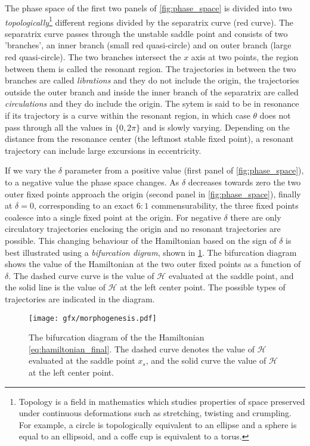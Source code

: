 \documentclass[ twoside,openright,titlepage,numbers=noenddot,headinclude,%
                footinclude=true,cleardoublepage=empty,abstractoff, %
                BCOR=5mm,paper=a4,fontsize=11pt,%
                american,%
                ]{scrreprt}
\begin{document}
The phase space of the first two panels of \cref{fig:phase_space} is divided into two
\emph{topologically}\footnote{Topology is a field in mathematics which studies 
properties of space preserved under continuous deformations such as stretching, twisting
and crumpling. For example, a circle is topologically equivalent to an ellipse and 
a sphere is equal to an ellipsoid, and a coffe cup is equivalent to a torus.} different
regions divided by the separatrix curve (red curve). The separatrix curve passes through
the unstable saddle point and consists of two
'branches', an inner branch (small red quasi-circle) and on outer branch (large red
quasi-circle).  The two branches intersect the $x$ axis at two points, the region between
them is called the resonant region. The trajectories 
in between the two branches are called \emph{librations} and they do not include the origin,
the trajectories outside the outer branch and inside the inner branch of the separatrix
are called \emph{circulations} and they do include the origin. The sytem is said to be
in resonance if its trajectory is a curve within the resonant region, in which case $\theta$
does not pass through all the values in $\{0,2\pi\}$ and is slowly varying. Depending on the
distance from the resonance center (the leftmost stable fixed point), a resonant trajectory
can include large excursions in eccentricity.

If we vary the $\delta$ parameter from a positive value (first panel of \cref{fig:phase_space}),
to a negative value the phase space changes. As $\delta$ decreases towards zero the two
outer fixed points approach the origin (second panel in \cref{fig:phase_space}), finally at 
$\delta=0$, corresponding to an exact $6:1$ commensurability, the three fixed points coalesce
into a single fixed point at the origin. For negative $\delta$ there are only circulatory 
trajectories enclosing the origin and no resonant trajectories are possible. This changing
behaviour of the Hamiltonian based on the sign of $\delta$ is best illustrated using
a \emph{bifurcation digram}, shown in \cref{fig:morphogenesis}. The bifurcation diagram
shows the value of the Hamiltonian at the two outer fixed points as a function of $\delta$.
The dashed curve curve is the value of $\mathcal{H}$ evaluated at the saddle point, and the 
solid line is the value of $\mathcal{H}$ at the left center point. The possible 
types of trajectories are indicated in the diagram.
\begin{figure}[htb]
\centering
\texttt{[image: gfx/morphogenesis.pdf]}
    \caption{The bifurcation diagram of the the Hamiltonian \ref{eq:hamiltonian_final}. 
    The dashed curve denotes the value of $\mathcal{H}$ evaluated at the saddle point $x_s$, and 
    the solid curve the value of $\mathcal{H}$ at the left center point.}
\label{fig:morphogenesis}
\end{figure}
\end{document}
